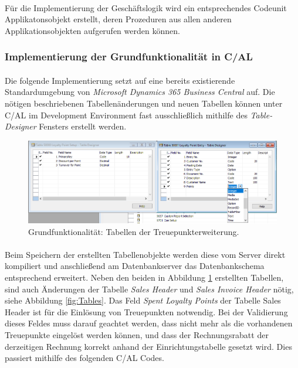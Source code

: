 \paragraph{}
Für die Implementierung der Geschäftslogik wird ein entsprechendes Codeunit Applikatonsobjekt erstellt, deren Prozeduren aus allen anderen Applikationsobjekten aufgerufen werden können.

\subsubsection{Implementierung der Grundfunktionalität in C/AL}
\paragraph{}
Die folgende Implementierung setzt auf eine bereits existierende Standardumgebung von \textit{Microsoft Dynamics 365 Business Central} auf. Die nötigen beschriebenen Tabellenänderungen und neuen Tabellen können unter C/AL im Development Environment fast ausschließlich mithilfe des \textit{Table-Designer} Fensters erstellt werden.
\begin{figure}[h]
	\centering
	\includegraphics[width=130mm]{images/CALTableDesigner}
	\caption{Grundfunktionalität: Tabellen der Treuepunkterweiterung.}
	\label{fig:Table Designer}
\end{figure}

\paragraph{}
Beim Speichern der erstellten Tabellenobjekte werden diese vom Server direkt kompiliert und anschließend am Datenbankserver das Datenbankschema entsprechend erweitert. Neben den beiden in Abbildung \ref{fig:Table Designer} erstellten Tabellen, sind auch Änderungen der Tabelle \textit{Sales Header} und \textit{Sales Invoice Header} nötig, siehe Abbildung \ref{fig:Tables}. Das Feld \textit{Spent Loyalty Points} der Tabelle {Sales Header} ist für die Einlösung von Treuepunkten notwendig. Bei der Validierung dieses Feldes muss darauf geachtet werden, dass nicht mehr als die vorhandenen Treuepunkte eingelöst werden können, und dass der Rechnungsrabatt der derzeitigen Rechnung korrekt anhand der Einrichtungstabelle gesetzt wird. Dies passiert mithilfe des folgenden C/AL Codes.

